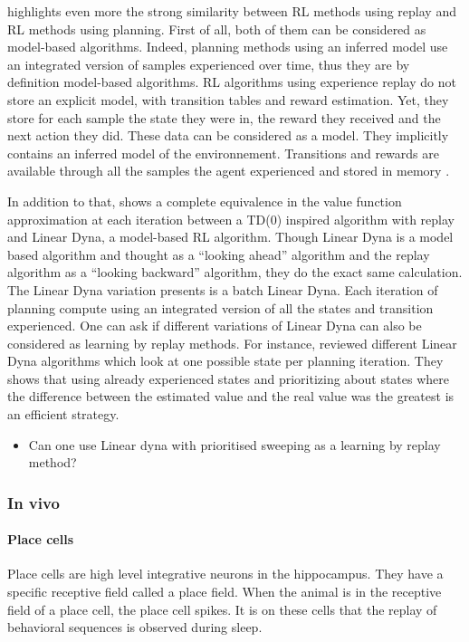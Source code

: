 \documentclass[]{article}
\begin{document}
\textcite{vanseijen_deeper_2015} highlights even more the strong similarity between RL methods using replay and RL methods using planning. First of all, both of them can be considered as model-based algorithms. Indeed, planning methods using an inferred model use an integrated version of samples experienced over time, thus they are by definition model-based algorithms.
RL algorithms using experience replay do not store an explicit model, with transition tables and reward estimation. Yet, they store for each sample the state they were in, the reward they received and the next action they did. These data can be considered as a model. They implicitly contains an inferred model of the environnement. Transitions and rewards are available through all the samples the agent experienced and stored in memory \parencite{vanseijen_deeper_2015}.


In addition to that, \textcite{vanseijen_deeper_2015} shows a complete equivalence in the value function approximation at each iteration between a TD(0) inspired algorithm with replay and Linear Dyna, a model-based RL algorithm. Though Linear Dyna is a model based algorithm and thought as a ``looking ahead'' algorithm and the replay algorithm as a ``looking backward'' algorithm, they do the exact same calculation.
The Linear Dyna variation \textcite{vanseijen_deeper_2015} presents is a batch Linear Dyna. Each iteration of planning compute using an integrated version of all the states and transition experienced. One can ask if different variations of Linear Dyna can also be considered as learning by replay methods. For instance, \textcite{sutton_dyna-style_2012} reviewed different Linear Dyna algorithms which look at one possible state per planning iteration. They shows that using already experienced states and prioritizing about states where the difference between the estimated value and the real value was the greatest is an efficient strategy.


\begin{itemize}
\item
  Can one use Linear dyna with prioritised sweeping as a learning by replay method?
\end{itemize}

\subsubsection{In vivo}
\label{sub:In vivo}

\paragraph{Place cells}\label{place-cells}
Place cells are high level integrative neurons in the hippocampus. They have a specific receptive field called a place field. When the animal is in the receptive field of a place cell, the place cell spikes. It is on these cells that the replay of behavioral sequences is observed during sleep.
\end{document}
